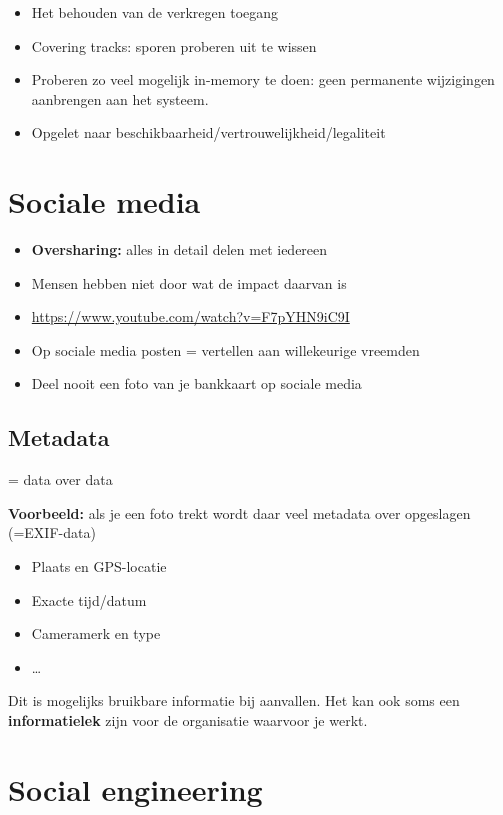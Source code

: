 \documentclass{article}
\newcommand{\bold}[1]{\textbf{#1}}
\begin{document}
\begin{itemize}
    \item Het behouden van de verkregen toegang
    \item Covering tracks: sporen proberen uit te wissen
    \item Proberen zo veel mogelijk in-memory te doen: geen permanente wijzigingen aanbrengen aan het systeem.  
    \item Opgelet naar beschikbaarheid/vertrouwelijkheid/legaliteit
\end{itemize}

\section{Sociale media}

\begin{itemize}
    \item \bold{Oversharing:} alles in detail delen met iedereen
    \item Mensen hebben niet door wat de impact daarvan is
    \item \url{https://www.youtube.com/watch?v=F7pYHN9iC9I}
    \item Op sociale media posten = vertellen aan willekeurige vreemden
    \item Deel nooit een foto van je bankkaart op sociale media
\end{itemize}

\subsection{Metadata}

= data over data

\bold{Voorbeeld:} als je een foto trekt wordt daar veel metadata over opgeslagen (=EXIF-data)

\begin{itemize}
    \item Plaats en GPS-locatie
    \item Exacte tijd/datum
    \item Cameramerk en type
    \item \dots
\end{itemize}

Dit is mogelijks bruikbare informatie bij aanvallen. 
Het kan ook soms een \bold{informatielek} zijn voor de organisatie waarvoor je werkt.

\section{Social engineering}
\end{document}
